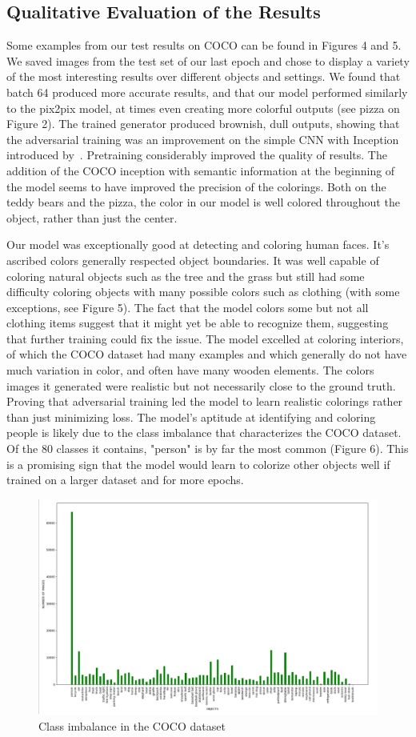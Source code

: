 \documentclass[10pt,twocolumn,letterpaper]{article}
\begin{document}
\subsection{Qualitative Evaluation of the Results}
Some examples from our test results on COCO can be found in Figures 4 and 5. We saved images from the test set of our last epoch and chose to display a variety of the most interesting results over different objects and settings. We found that batch 64 produced more accurate results, and that our model performed similarly to the pix2pix model, at times even creating more colorful outputs (see pizza on Figure 2). The trained generator produced brownish, dull outputs, showing that the adversarial training was an improvement on the simple CNN with Inception introduced by~\cite{Koalarization}. Pretraining considerably improved the quality of results. The addition of the COCO inception with semantic information at the beginning of the model seems to have improved the precision of the colorings. Both on the teddy bears and the pizza, the color in our model is well colored throughout the object, rather than just the center. 

Our model was exceptionally good at detecting and coloring human faces. It’s ascribed colors generally respected object boundaries. It was well capable of coloring natural objects such as the tree and the grass but still had some difficulty coloring objects with many possible colors such as clothing (with some exceptions, see Figure 5). The fact that the model colors some but not all clothing items suggest that it might yet be able to recognize them, suggesting that further training could fix the issue. The model excelled at coloring interiors, of which the COCO dataset had many examples and which generally do not have much variation in color, and often have many wooden elements. The colors images it generated were realistic but not necessarily close to the ground truth. Proving that adversarial training led the model to learn realistic colorings rather than just minimizing loss. The model's aptitude at identifying and coloring people is likely due to the class imbalance that characterizes the COCO dataset. Of the 80 classes it contains, "person" is by far the most common (Figure 6). This is a promising sign that the model would learn to colorize other objects well if trained on a larger dataset and for more epochs.
\begin{figure}
    \centering
    \includegraphics[width=0.5\linewidth]{latex/class_imbalance_coco.jpg}
    \caption{Class imbalance in the COCO dataset}
    \label{fig:enter-label}
\end{figure}
\end{document}
